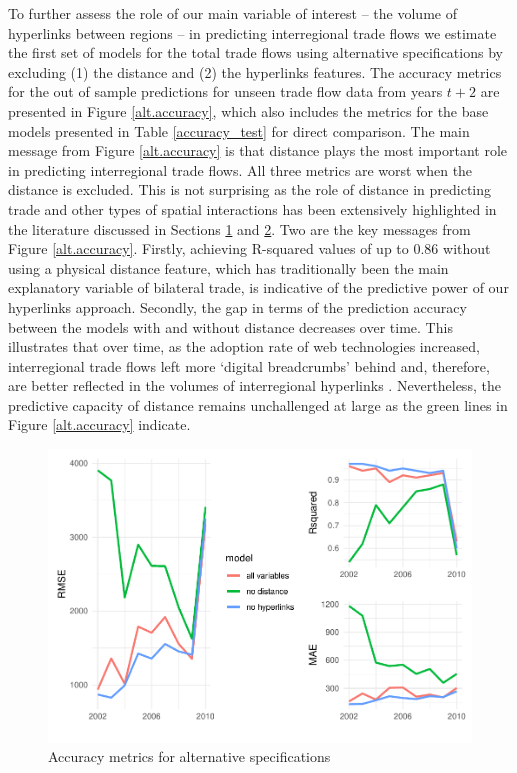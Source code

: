 \documentclass[]{interact}
\theoremstyle{plain}%
\theoremstyle{definition}
\theoremstyle{remark}
\begin{document}
To further assess the role of our main variable of interest -- the
volume of hyperlinks between regions -- in predicting interregional
trade flows we estimate the first set of models for the total trade
flows using alternative specifications by excluding (1) the distance and
(2) the hyperlinks features. The accuracy metrics for the out of sample
predictions for unseen trade flow data from years \(t + 2\) are
presented in Figure \ref{alt.accuracy}, which also includes the metrics
for the base models presented in Table \ref{accuracy_test} for direct
comparison. The main message from Figure \ref{alt.accuracy} is that
distance plays the most important role in predicting interregional trade
flows. All three metrics are worst when the distance is excluded. This
is not surprising as the role of distance in predicting trade and other
types of spatial interactions has been extensively highlighted in the
literature discussed in Sections \protect\hyperlink{sec:1}{1} and
\protect\hyperlink{sec:2}{2}. Two are the key messages from Figure
\ref{alt.accuracy}. Firstly, achieving R-squared values of up to
\(0.86\) without using a physical distance feature, which has
traditionally been the main explanatory variable of bilateral trade, is
indicative of the predictive power of our hyperlinks approach. Secondly,
the gap in terms of the prediction accuracy between the models with and
without distance decreases over time. This illustrates that over time,
as the adoption rate of web technologies increased, interregional trade
flows left more `digital breadcrumbs' behind and, therefore, are better
reflected in the volumes of interregional hyperlinks
\citep{rabari_storper2014}. Nevertheless, the predictive capacity of
distance remains unchallenged at large as the green lines in Figure
\ref{alt.accuracy} indicate.

\begin{figure}[p]
\includegraphics[width=1\linewidth]{hl_v2_files/figure-latex/unnamed-chunk-10-1} \caption{\label{alt.accuracy}Accuracy metrics for alternative specifications}\label{fig:unnamed-chunk-10}
\end{figure}
\end{document}
